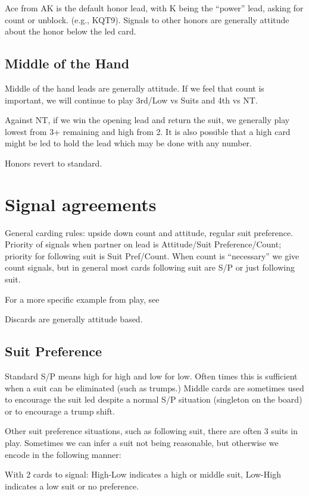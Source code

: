 \documentclass[tom-ari]{subfiles}
\begin{document}
Ace from AK is the default honor lead, with K being the ``power'' lead, asking for count or unblock. (e.g., KQT9). Signals to other honors are generally attitude about the honor below the led card.


\section{Middle of the Hand}

Middle of the hand leads are generally attitude. If we feel that count is important, we will continue to play 3rd/Low vs Suits and 4th vs NT.

Against NT, if we win the opening lead and return the suit, we generally play lowest from 3+ remaining and high from 2. It is also possible that a high card might be led to hold the lead which may be done with any number.

Honors revert to standard. 

\chapter{Signal agreements}

General carding rules: upside down count and attitude, regular suit preference. Priority of signals when partner on lead is Attitude/Suit Preference/Count; priority for following suit is Suit Pref/Count. When count is ``necessary'' we give count signals, but in general most cards following suit are S/P or just following suit.

For a more specific example from play, see 

Discards are generally attitude based.

\section{Suit Preference}  

Standard S/P means high for high and low for low.  Often times this is sufficient when a suit can be eliminated (such as trumps.) Middle cards are sometimes used to encourage the suit led despite a normal S/P situation (singleton on the board) or to encourage a trump shift.

Other suit preference situations, such as following suit, there are often 3 suits in play. Sometimes we can infer a suit not being reasonable, but otherwise we encode in the following manner:

With 2 cards to signal: High-Low indicates a high or middle suit, Low-High indicates a low suit or no preference.
\end{document}
